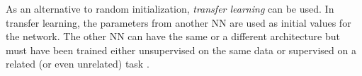 As an alternative to random initialization, \textit{transfer learning} can be used. In transfer learning, the parameters from another \gls{NN} are used as initial values for the network. The other \gls{NN} can have the same or a different architecture but must have been trained either unsupervised on the same data or supervised on a related (or even unrelated) task \cite{Goodfellow2016}.
